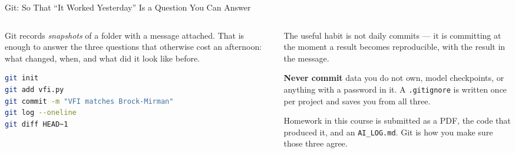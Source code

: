 \begin{frame}[fragile]{Git: So That ``It Worked Yesterday'' Is a Question You Can Answer}
\begin{columns}[T]
\begin{column}{0.48\textwidth}
\small
Git records \emph{snapshots} of a folder with a message attached. That is enough to answer the three questions that otherwise cost an afternoon: what changed, when, and what did it look like before.
\medskip
\begin{lstlisting}[language=bash]
git init
git add vfi.py
git commit -m "VFI matches Brock-Mirman"
git log --oneline
git diff HEAD~1
\end{lstlisting}
\end{column}
\begin{column}{0.49\textwidth}
\begin{conceptbox}[title=\textbf{Commit when a number changes}]\small
The useful habit is not daily commits --- it is committing at the moment a result becomes reproducible, with the result in the message.
\end{conceptbox}
\medskip
\begin{cautionbox}\footnotesize
\textbf{Never commit} data you do not own, model checkpoints, or anything with a password in it. A \texttt{.gitignore} is written once per project and saves you from all three.
\end{cautionbox}
\medskip
\footnotesize
Homework in this course is submitted as a PDF, the code that produced it, and an \texttt{AI\_LOG.md}. Git is how you make sure those three agree.
\end{column}
\end{columns}
\vspace{1mm}
\end{frame}

